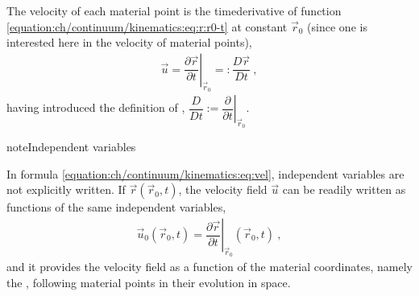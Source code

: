 \documentclass[letterpaper,10pt,english]{jupyterBook}
\begin{document}
\sphinxAtStartPar
{} The velocity of each material point is the time\sphinxhyphen{}derivative of function \eqref{equation:ch/continuum/kinematics:eq:r:r0-t} at constant \(\vec{r}_0\) (since one is interested here in the velocity of material points),
\begin{equation}\label{equation:ch/continuum/kinematics:eq:vel}
\begin{split}\vec{u} = \left.\dfrac{\partial \vec{r}}{\partial t}\right|_{\vec{r}_0} =: \dfrac{D \vec{r}}{D t} \ ,\end{split}
\end{equation}
\sphinxAtStartPar
having introduced the definition of , \(\dfrac{D}{Dt} := \left.\dfrac{\partial}{\partial t}\right|_{\vec{r}_0}\).

\begin{sphinxadmonition}{note}{Independent variables}

\sphinxAtStartPar
In formula \eqref{equation:ch/continuum/kinematics:eq:vel}, independent variables are not explicitly written. If \(\vec{r}\left(\vec{r}_0, t\right)\), the velocity field \(\vec{u}\) can be readily written as functions of the same independent variables,
\begin{equation*}
\begin{split}\vec{u}_0\left( \vec{r}_0, t\right) = \left.\dfrac{\partial \vec{r}}{\partial t}\right|_{\vec{r}_0}(\vec{r}_0, t) \ , \end{split}
\end{equation*}
\sphinxAtStartPar
and it provides the velocity field as a function of the material coordinates, namely the , following material points in their evolution in space.


\end{sphinxadmonition}
\end{document}
